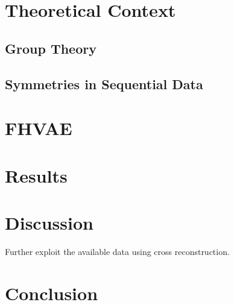 \documentclass{article} %
\begin{document}
\section*{Theoretical Context}
\lipsum[4-6]\cite{Papamakarios2016, Ardizzone2019}

\subsection*{Group Theory}


\subsection*{Symmetries in Sequential Data}


\section*{FHVAE}
\lipsum[4-6]\cite{Cranmer2020}

\section*{Results}
\lipsum[7-12]\cite{Brehmer2020}

\section*{Discussion}
Further exploit the available data using cross reconstruction.

\section*{Conclusion}
\lipsum[1-2]




\end{document}
